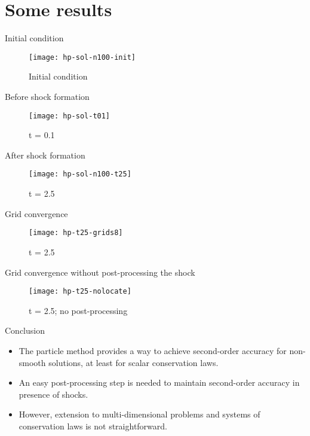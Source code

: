 \documentclass{beamer}
\begin{document}
\section{Some results}
\begin{frame}{Initial condition}
\begin{figure}
	\texttt{[image: hp-sol-n100-init]}
	\caption{Initial condition}
\end{figure}
\end{frame}

\begin{frame}{Before shock formation}
	\begin{figure}
		\texttt{[image: hp-sol-t01]}
		\caption{t = 0.1}
	\end{figure}
\end{frame}

\begin{frame}{After shock formation}
	\begin{figure}
		\texttt{[image: hp-sol-n100-t25]}
		\caption{t = 2.5}
	\end{figure}
\end{frame}

\begin{frame}{Grid convergence}
	\begin{figure}
		\texttt{[image: hp-t25-grids8]}
		\caption{t = 2.5}
	\end{figure}
\end{frame}

\begin{frame}{Grid convergence without post-processing the shock}
	\begin{figure}
		\texttt{[image: hp-t25-nolocate]}
		\caption{t = 2.5; no post-processing}
	\end{figure}
\end{frame}

\begin{frame}{Conclusion}
\begin{itemize}
	\item The particle method provides a way to achieve second-order accuracy for non-smooth solutions, at least for scalar conservation laws.
	\item An easy post-processing step is needed to maintain second-order accuracy in presence of shocks.
	\item However, extension to multi-dimensional problems and systems of conservation laws is not straightforward.
\end{itemize}
\end{frame}
\end{document}
